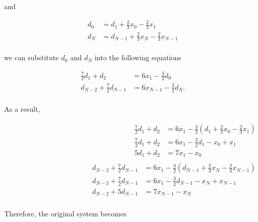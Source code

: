 \documentclass[paper=a4, fontsize=11pt]{scrartcl} %
\begin{document}
and 

\begin{align*}
    d_{0} &= d_{1} + \frac{2}{3} x_{0} - \frac{2}{3} x_{1}\\
    d_{N} &= d_{N-1} + \frac{2}{3} x_{N} - \frac{2}{3} x_{N-1}\\
\end{align*}

we can substitute $d_{0}$ and $d_{N}$ into the following equations

\begin{align*}
    \frac{7}{2}d_{1} + d_{2} &= 6x_{1} - \frac{3}{2}d_{0}\\
    d_{N-2} + \frac{7}{2}d_{N-1}  &= 6x_{N-1} - \frac{3}{2}d_{N}.\\
\end{align*}

As a result,

\begin{align*}
    \begin{split}
        \frac{7}{2}d_{1} + d_{2} &= 6x_{1} - \frac{3}{2}\left( d_{1} + \frac{2}{3} x_{0} - \frac{2}{3} x_{1} \right)\\
        \frac{7}{2}d_{1} + d_{2} &= 6x_{1} - \frac{3}{2} d_{1} - x_{0} + x_{1}\\
        5d_{1} + d_{2} &= 7x_{1} - x_{0}\\
    \end{split}
    \begin{split}
        d_{N-2} + \frac{7}{2}d_{N-1} &= 6x_{1} - \frac{3}{2}\left( d_{N-1} + \frac{2}{3} x_{N} - \frac{2}{3} x_{N-1} \right)\\
        d_{N-2} + \frac{7}{2}d_{N-1} &= 6x_{1} - \frac{3}{2} d_{N-1} - x_{N} + x_{N-1}\\
        d_{N-2} + 5d_{N-1} &= 7x_{N-1} - x_{N}\\
    \end{split}
\end{align*}

Therefore, the original system becomes
\end{document}
